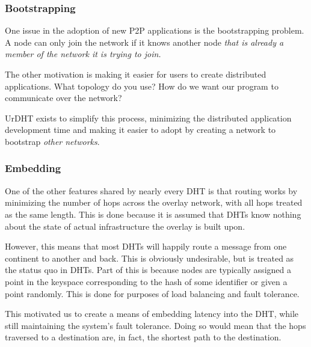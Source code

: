 \documentclass[11pt,conference]{IEEEtran}
\begin{document}
\subsubsection{Bootstrapping}
One issue in the adoption of new P2P applications is the bootstrapping problem.
A node can only join the network if it knows another node \textit{that is already a member of the network it is trying to join.}


The other motivation is making it easier for users to create distributed applications.
What topology do you use?
How do we want our program to communicate over the network?


UrDHT exists to simplify this process, minimizing the distributed application development time and making it easier to adopt by creating a network to bootstrap \textit{other networks}.


\subsubsection{Embedding}


One of the other features shared by nearly every DHT is that routing works by minimizing the number of hops across the overlay network, with all hops treated as the same length.
This is done because it is assumed that DHTs know nothing about the state of actual infrastructure the overlay is built upon.

However, this means that most DHTs will happily route a message from one continent to another and back.
This is obviously undesirable, but is treated as the status quo in DHTs.
Part of this is because nodes are typically assigned a point in the keyspace corresponding to the hash of some identifier or given a point randomly.
This is done for purposes of load balancing and fault tolerance.

This motivated us to create a means of embedding latency into the DHT,
while still maintaining the system's fault tolerance.
Doing so would mean that the hops traversed to a destination are, in fact, the shortest path to the destination.
\end{document}
